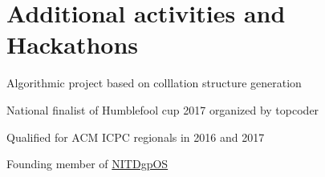 \documentclass[a4paper]{deedy-resume} %
\begin{document}
\begin{minipage}[t]{0.66\textwidth}

\sectionspace


\section{Additional activities and Hackathons}

\sectionspace

\begin{tightitemize}
\item Algorithmic project based on colllation structure generation \\
\item National finalist of Humblefool cup 2017 organized by topcoder\\
\item Qualified for ACM ICPC regionals in 2016 and 2017\\
\item Founding member of \href{https://github.com/NITDgpOS}{NITDgpOS}
\end{tightitemize}


\end{minipage} %
\end{document}
